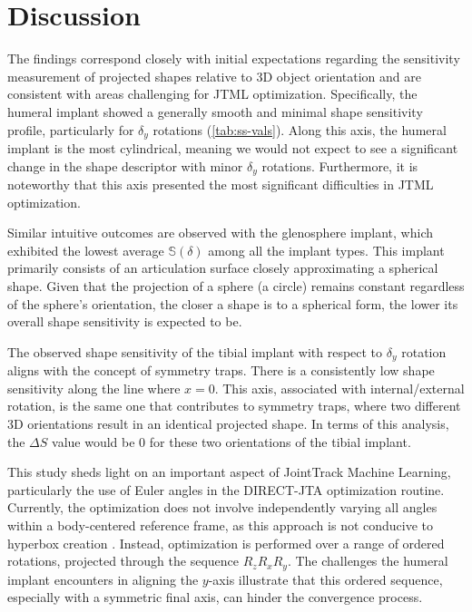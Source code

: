 \section{Discussion}
The findings correspond closely with initial expectations regarding the sensitivity measurement of projected shapes relative to 3D object orientation and are consistent with areas challenging for JTML optimization.
Specifically, the humeral implant showed a generally smooth and minimal shape sensitivity profile, particularly for $\delta_{y}$ rotations (\cref{tab:ss-vals}).
Along this axis, the humeral implant is the most cylindrical, meaning we would not expect to see a significant change in the shape descriptor with minor $\delta_{y}$ rotations.
Furthermore, it is noteworthy that this axis presented the most significant difficulties in JTML optimization.

Similar intuitive outcomes are observed with the glenosphere implant, which exhibited the lowest average $\mathbb{S}(\delta)$ among all the implant types.
This implant primarily consists of an articulation surface closely approximating a spherical shape.
Given that the projection of a sphere (a circle) remains constant regardless of the sphere's orientation, the closer a shape is to a spherical form, the lower its overall shape sensitivity is expected to be.

The observed shape sensitivity of the tibial implant with respect to $\delta_{y}$ rotation aligns with the concept of symmetry traps.
There is a consistently low shape sensitivity along the line where $x=0$.
This axis, associated with internal/external rotation, is the same one that contributes to symmetry traps, where two different 3D orientations result in an identical projected shape.
In terms of this analysis, the $\Delta S$ value would be $0$ for these two orientations of the tibial implant.

This study sheds light on an important aspect of JointTrack Machine Learning, particularly the use of Euler angles in the DIRECT-JTA optimization routine.
Currently, the optimization does not involve independently varying all angles within a body-centered reference frame, as this approach is not conducive to hyperbox creation \cite{floodAutomatedRegistration3D2018,jonesLipschitzianOptimizationLipschitz1993}.
Instead, optimization is performed over a range of ordered rotations, projected through the sequence $R_{z}R_{x}R_{y}$.
The challenges the humeral implant encounters in aligning the $y$-axis illustrate that this ordered sequence, especially with a symmetric final axis, can hinder the convergence process.

